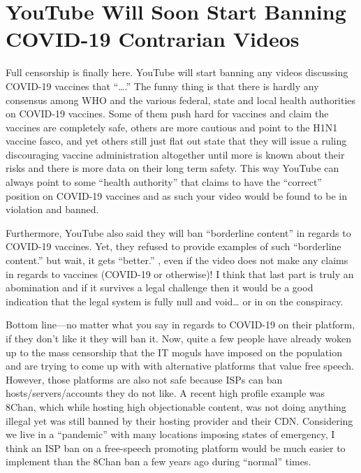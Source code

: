 \chapter{YouTube Will Soon Start Banning COVID-19 Contrarian Videos}

\begin{refsection}

Full censorship is finally here. YouTube will start banning any videos discussing COVID-19 vaccines that \enquote{\dots{}.} The funny thing is that there is hardly any consensus among WHO and the various federal, state and local health authorities on COVID-19 vaccines. Some of them push hard for vaccines and claim the vaccines are completely safe, others are more cautious and point to the H1N1 vaccine fasco, and yet others still just flat out state that they will issue a ruling discouraging vaccine administration altogether until more is known about their risks and there is more data on their long term safety. This way YouTube can always point to some \enquote{health authority} that claims to have the \enquote{correct} position on COVID-19 vaccines and as such your video would be found to be in violation and banned.

Furthermore, YouTube also said they will ban \enquote{borderline content} in regards to COVID-19 vaccines. Yet, they refused to provide examples of such \enquote{borderline content.} but wait, it gets \enquote{better.} , even if the video does not make any claims in regards to vaccines (COVID-19 or otherwise)! I think that last part is truly an abomination and if it survives a legal challenge then it would be a good indication that the legal system is fully null and void\dots{} or in on the conspiracy.

Bottom line---no matter what you say in regards to COVID-19 on their platform, if they don't like it they will ban it. Now, quite a few people have already woken up to the mass censorship that the IT moguls have imposed on the population and are trying to come up with with alternative platforms that value free speech. However, those platforms are also not safe because ISPs can ban hosts/servers/accounts they do not like. A recent high profile example was 8Chan, which while hosting high objectionable content, was not doing anything illegal yet was still banned by their hosting provider and their CDN. Considering we live in a \enquote{pandemic} with many locations imposing states of emergency, I think an ISP ban on a free-speech promoting platform would be much easier to implement than the 8Chan ban a few years ago during \enquote{normal} times.


\end{refsection}
